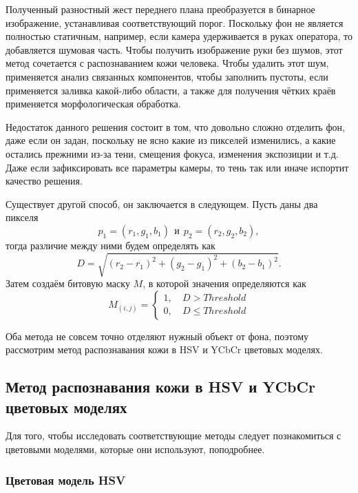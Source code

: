 Полученный разностный жест переднего плана преобразуется в бинарное изображение, устанавливая
соответствующий порог. Поскольку фон не является полностью статичным, например, если камера
удерживается в руках оператора, то добавляется шумовая часть. Чтобы получить изображение руки
без шумов, этот метод сочетается с распознаванием кожи человека. Чтобы удалить этот шум, 
применяется анализ связанных компонентов, чтобы заполнить пустоты, если применяется заливка
какой-либо области, а также для получения чётких краёв применяется морфологическая обработка.

Недостаток данного решения состоит в том, что довольно сложно отделить фон, даже если он задан,
поскольку не ясно какие из пикселей изменились, а какие остались прежними из-за тени, смещения
фокуса, изменения экспозиции и т.д. Даже если зафиксировать все параметры камеры, то тень так
или иначе испортит качество решения.

Существует другой способ, он заключается в следующем. 
Пусть даны два пикселя 
\begin{equation}
	p_1 = (r_1, g_1, b_1)~~и~~p_2 = (r_2, g_2, b_2),
	\label{pixels_bg}
\end{equation}
тогда различие между ними будем определять как
\begin{equation}
	D = \sqrt{(r_2 - r_1)^2 + (g_2 - g_1)^2 + (b_2 - b_1)^2}.
	\label{distance}
\end{equation}
Затем создаём битовую маску $M$, в которой значения определяются как
\begin{equation}
	M_{(i,j)}=\left\{\begin{aligned}
	1,~& D > Threshold\\
	0,~& D \leq Threshold
\end{aligned}\right. 
\label{bite-mask}
\end{equation}

Оба метода не совсем точно отделяют нужный объект от фона, поэтому 
рассмотрим метод распознавания кожи в HSV и YCbCr цветовых моделях.

\newpage

\subsection{Метод распознавания кожи в HSV и YCbCr цветовых моделях}

Для того, чтобы исследовать соответствующие методы следует познакомиться
 с цветовыми моделями, которые они используют, поподробнее.

\subsubsection{Цветовая модель HSV}

